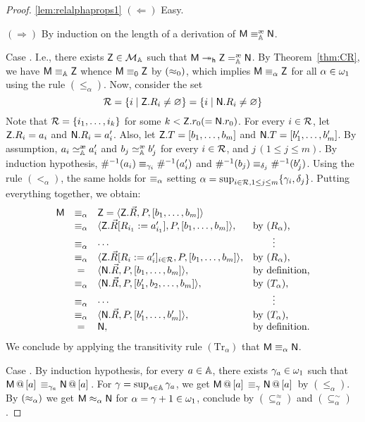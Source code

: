 \begin{proof}\ref{lem:relalphaprops1} $(\Leftarrow)$ Easy.

$(\Rightarrow)$ By induction on the length of a derivation of $\mM\equivea\mN$.

Case \redwerule. I.e., there exists $\mZ\in\cM$ such that $\mM\reddh\mZ\eqea\mN$.
By Theorem~\ref{thm:CR}, we have $\mM\equiva\mZ$ whence $\mM\eq[0]\mZ$ by $(\pesc[0])$, which implies $\mM\eq\mZ$ for all $\alpha\in\Count$ using the rule $(\le_\alpha)$. Now, consider the set
\[
	\cR = \set{ i \st \mZ.R_i \neq\Null} = \set{ i \st \mN.R_i \neq\Null}
\]
Note that $\cR= \set{i_1,\dots,i_k}$ for some $k<\mZ.r_0 (=\mN.r_0)$. For every $i\in\cR$, let $\mZ.R_i = a_i$ and $\mN.R_i = a'_i$. Also, let $\mZ.T = [b_1,\dots,b_m]$ and $\mN.T = [b'_1,\dots,b'_m]$. By assumption, $a_i\simea a'_i$ and $b_j\simea b'_j$ for every $i\in\cR$, and $j\,(1\le j\le m)$.
By induction hypothesis, $\Lookinv{a_i} \eq[\gamma_i] \Lookinv{a'_i}$ and $\Lookinv{b_j} \eq[\delta_j] \Lookinv{b'_j}$. Using the rule $(<_\alpha)$, the same holds for $\eq[\alpha]$ setting $\alpha = \sup_{i\in\cR,1\le j\le m} \set{\gamma_i,\delta_j}$. Putting everything together, we obtain:
\[
	\begin{array}{lcll}
	\mM&\eq&\mZ = \tuple{\mZ.\vec R,P,[b_1,\dots,b_m]}\\
	&\eq&\tuple{\mZ.\vec R\repl{R_{i_1}}{a'_{i_1}},P,[b_1,\dots,b_m]},&\textrm{by $(R_\alpha)$,}\\
	&\eq&\cdots&\qquad\vdots\\
	&\eq&\tuple{\mZ.\vec R[R_i:= a'_i]_{i\in\cR},P,[b_1,\dots,b_m]},&\textrm{by $(R_\alpha)$,}\\
	&=&\tuple{\mN.\vec R,P,[b_1,\dots,b_m]},&\textrm{by definition,}\\
	&\eq&\tuple{\mN.\vec R,P,[b'_1,b_2,\dots,b_m]},&\textrm{by $(T_\alpha)$,}\\
	&\eq&\cdots&\qquad\vdots\\
	&\eq&\tuple{\mN.\vec R,P,[b'_1,\dots,b'_m]},&\textrm{by $(T_\alpha)$,}\\
	&=&\mN,&\textrm{by definition.}\\
	\end{array}
\]
We conclude by applying the transitivity rule $(\mathrm{Tr}_\alpha)$ that $\mM \eq \mN$.

Case \extrule. By induction hypothesis, for every $a\in\Addrs$, there exists $\gamma_a\in\Count$ such that $\append{\mM}{a} \eq[\gamma_a]\append{\mN}{a}$.
For $\gamma = \sup_{a\in\Addrs}\gamma_a$, we get $\append{\mM}{a} \eq[\gamma]\append{\mN}{a}$ by $(\le_\alpha)$. By $(\pesc)$ we get $\mM\pesc\mN$ for $\alpha=\gamma+1\in\Count$, conclude by $(\subseteq^\approx_\alpha)$ and $(\subseteq^\sim_\alpha)$.


\end{proof}
